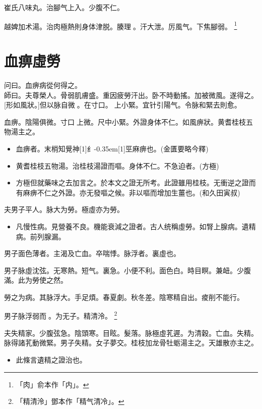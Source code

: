 \documentclass[oneside,b4paper]{ctexbook}
\begin{document}
\begin{flushleft}
崔氏八味丸。治腳气上入。少腹不仁。

越婢加术湯。治肉極熱則身体津脱。腠理{𫔭}。汗大泄。厉風气。下焦腳弱。
\footnote{「肉」俞本作「内」。}

\chapter{血痹虛勞}

问曰。血痹病從何得之。\\
師曰。夫尊榮人。骨弱肌膚盛。重因疲勞汗出。卧不時動搖。加被微風。遂得之。[形如風狀。]但以脉自微{𬈧}。在寸口。{𬮦}上小緊。宜针引陽气。令脉和緊去則愈。

血痹。陰陽俱微。寸口{𬮦}上微。尺中小緊。外證身体不仁。如風痹狀。黄耆桂枝五物湯主之。

\begin{itemize}
\item 血痹者。末梢知覺神{\hbox{\scalebox{0.68}[1]{纟}\kern-0.35em\scalebox{0.64}[1]{巠}}}麻痹也。(金匱要略今釋)
\item 黄耆桂枝五物湯。治桂枝湯證而嘔。身体不仁。不急迫者。(方極)
\item 方極但就藥味之去加言之。於本文之證无所考。此證雖用桂枝。无衝逆之證而有麻痹不仁之外證。亦无發嘔之候。非以嘔而增加生薑也。(和久田寅叔)
\end{itemize}

夫男子平人。脉大为勞。極虛亦为勞。

\begin{itemize}
\item 凡慢性病。見營養不良。機能衰減之證者。古人统稱虛勞。如腎上腺病。遺精病。前列腺漏。
\end{itemize}

男子面色薄者。主渴及亡血。卒喘悸。脉浮者。裏虛也。

男子脉虛沈弦。无寒熱。短气。裏急。小便不利。面色白。時目瞑。兼衄。少腹滿。此为勞使之然。

勞之为病。其脉浮大。手足煩。春夏劇。秋冬差。陰寒精自出。痠削不能行。

男子脉浮弱而{𬈧}。为无子。精清泠。
\footnote{「精清泠」鄧本作「精气清冷」。}

夫失精家。少腹弦急。陰頭寒。目眩。髮落。脉極虛芤遲。为清穀。亡血。失精。脉得諸芤動微緊。男子失精。女子夢交。桂枝加龙骨牡蛎湯主之。天雄散亦主之。

\begin{itemize}
\item 此條言遺精之證治也。
\end{itemize}


\end{flushleft}
\end{document}
